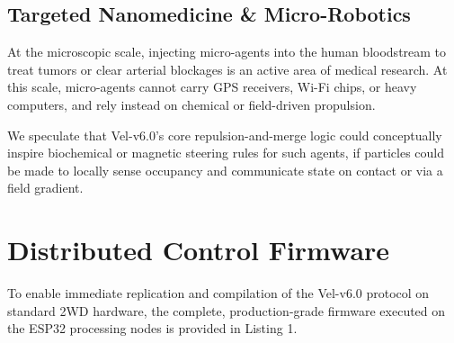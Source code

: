 \documentclass[journal,twoside]{IEEEtran}
\begin{document}
\subsection{Targeted Nanomedicine \& Micro-Robotics}
At the microscopic scale, injecting micro-agents into the human bloodstream to treat tumors or clear arterial blockages is an active area of medical research. At this scale, micro-agents cannot carry GPS receivers, Wi-Fi chips, or heavy computers, and rely instead on chemical or field-driven propulsion.

We speculate that Vel-v6.0's core repulsion-and-merge logic could conceptually inspire biochemical or magnetic steering rules for such agents, if particles could be made to locally sense occupancy and communicate state on contact or via a field gradient.

\section{Distributed Control Firmware}
\label{sec:firmware}

To enable immediate replication and compilation of the Vel-v6.0 protocol on standard 2WD hardware, the complete, production-grade firmware executed on the ESP32 processing nodes is provided in Listing 1.
\end{document}
